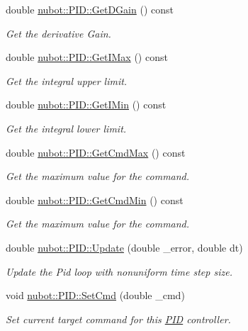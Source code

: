 \begin{DoxyCompactItemize}
double \hyperlink{group__gazebo__common_gaee309a8f184f0a2de417d24513f7e48a}{nubot\-::\-P\-I\-D\-::\-Get\-D\-Gain} () const 
\begin{DoxyCompactList}\small\item\em Get the derivative Gain. \end{DoxyCompactList}\item 
double \hyperlink{group__gazebo__common_ga49f73670f78e53265eae69338c084062}{nubot\-::\-P\-I\-D\-::\-Get\-I\-Max} () const 
\begin{DoxyCompactList}\small\item\em Get the integral upper limit. \end{DoxyCompactList}\item 
double \hyperlink{group__gazebo__common_gad0330647e22283f20d217b0e2d6cd420}{nubot\-::\-P\-I\-D\-::\-Get\-I\-Min} () const 
\begin{DoxyCompactList}\small\item\em Get the integral lower limit. \end{DoxyCompactList}\item 
double \hyperlink{group__gazebo__common_ga0738df8f919a587a843f23387e7f67f4}{nubot\-::\-P\-I\-D\-::\-Get\-Cmd\-Max} () const 
\begin{DoxyCompactList}\small\item\em Get the maximum value for the command. \end{DoxyCompactList}\item 
double \hyperlink{group__gazebo__common_ga64a6e969502546bc315ff69ef157269f}{nubot\-::\-P\-I\-D\-::\-Get\-Cmd\-Min} () const 
\begin{DoxyCompactList}\small\item\em Get the maximum value for the command. \end{DoxyCompactList}\item 
double \hyperlink{group__gazebo__common_gaa1e86d60a148f38574c130538e0ea9d1}{nubot\-::\-P\-I\-D\-::\-Update} (double \-\_\-error, double dt)
\begin{DoxyCompactList}\small\item\em Update the Pid loop with nonuniform time step size. \end{DoxyCompactList}\item 
void \hyperlink{group__gazebo__common_gac2a48aa0f59da310078de11a776968d7}{nubot\-::\-P\-I\-D\-::\-Set\-Cmd} (double \-\_\-cmd)
\begin{DoxyCompactList}\small\item\em Set current target command for this \hyperlink{classnubot_1_1PID}{P\-I\-D} controller. \end{DoxyCompactList}\item 

\end{DoxyCompactItemize}
